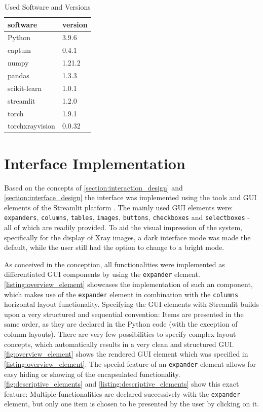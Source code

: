 \documentclass[11pt,a4paper,english]{scrreprt}
\begin{document}
\begin{table}[htbp]
    \centering
    \begin{tabularx}{0.3\textwidth}{ l l }
        \toprule
        software & version \\
        \midrule
        Python & 3.9.6 \\
        captum & 0.4.1 \\
        numpy & 1.21.2 \\
        pandas & 1.3.3 \\
        scikit-learn & 1.0.1 \\
        streamlit & 1.2.0 \\
        torch & 1.9.1 \\
        torchxrayvision & 0.0.32 \\
        \bottomrule
    \end{tabularx}
    \caption{Used Software and Versions}
    \label{table:software_versions}
\end{table}

\section{Interface Implementation}\label{section:interface_implementation}
Based on the concepts of \autoref{section:interaction_design} and \autoref{section:interface_design} the interface was implemented using the tools and GUI elements of the Streamlit platform \parencite{streamlit_github}. The mainly used GUI elements were: \texttt{expanders}, \texttt{columns}, \texttt{tables}, \texttt{images}, \texttt{buttons}, \texttt{checkboxes} and \texttt{selectboxes} - all of which are readily provided. To aid the visual impression of the system, specifically for the display of Xray images, a dark interface mode was made the default, while the user still had the option to change to a bright mode.

As conceived in the conception, all functionalities were implemented as differentiated GUI components by using the \texttt{expander} element. \autoref{listing:overview_element} showcases the implementation of such an component, which makes use of the \texttt{expander} element in combination with the \texttt{columns} horizontal layout functionality. Specifying the GUI elements with Streamlit builds upon a very structured and sequential convention: Items are presented in the same order, as they are declared in the Python code (with the exception of column layouts). There are very few possibilities to specify complex layout concepts, which automatically results in a very clean and structured GUI. \autoref{fig:overview_element} shows the rendered GUI element which was specified in \autoref{listing:overview_element}. The special feature of an \texttt{expander} element allows for easy hiding or showing of the encapsulated functionality. \autoref{fig:descriptive_elements} and \autoref{listing:descriptive_elements} show this exact feature: Multiple functionalities are declared successively with the \texttt{expander} element, but only one item is chosen to be presented by the user by clicking on it.
\end{document}
